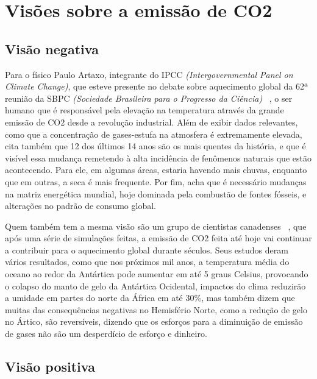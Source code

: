 \section{Visões sobre a emissão de CO2}

\subsection{Visão negativa}
Para o físico Paulo Artaxo, integrante do IPCC \textit{(Intergovernmental
Panel on Climate Change)}, que esteve presente no debate sobre aquecimento
global da 62ª reunião da SBPC \textit{(Sociedade Brasileira para o Progresso
da Ciência)} ~\cite{Medeiros}, o ser humano que é responsável pela elevação na
temperatura através da grande emissão de CO2 desde a revolução industrial.
Além de exibir dados relevantes, como que a concentração de gases-estufa na
atmosfera é extremamente elevada, cita também que 12 dos últimos 14 anos são
os mais quentes da história, e que é visível essa mudança remetendo à alta
incidência de fenômenos naturais que estão acontecendo. Para ele, em algumas
áreas, estaria havendo mais chuvas, enquanto que em outras, a seca é mais
frequente. Por fim, acha que é necessário mudanças na matriz energética
mundial, hoje dominada pela combustão de fontes fósseis, e alterações no
padrão de consumo global.

Quem também tem a mesma visão são um grupo de cientistas canadenses
~\cite{Reuters}, que após uma série de simulações feitas, a emissão de CO2 feita
até hoje vai continuar a contribuir para o aquecimento global durante
séculos. Seus estudos deram vários resultados, como que nos próximos mil anos, a
temperatura média do oceano ao redor da Antártica pode aumentar em até 5
graus Celsius, provocando o colapso do manto de gelo da Antártica Ocidental,
impactos do clima reduzirão a umidade em partes do norte da África em até
30\%, mas também dizem que muitas das consequências negativas no Hemisfério
Norte, como a redução de gelo no Ártico, são reversíveis, dizendo que os
esforços para a diminuição de emissão de gases não são um desperdício de
esforço e dinheiro.

\subsection{Visão positiva}

